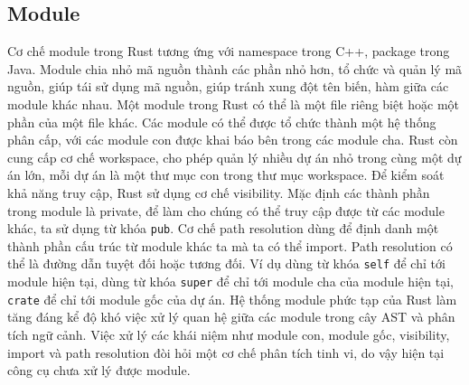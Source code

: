 \subsection{Module}

Cơ chế module trong Rust tương ứng với namespace trong C++, package trong Java.
Module chia nhỏ mã nguồn thành các phần nhỏ hơn, tổ chức và quản lý mã nguồn, giúp tái sử dụng mã nguồn, giúp tránh xung đột tên biến, hàm giữa các module khác nhau.
Một module trong Rust có thể là một file riêng biệt hoặc một phần của một file khác.
Các module có thể được tổ chức thành một hệ thống phân cấp, với các module con được khai báo bên trong các module cha.
Rust còn cung cấp cơ chế workspace, cho phép quản lý nhiều dự án nhỏ trong cùng một dự án lớn, mỗi dự án là một thư mục con trong thư mục workspace.
Để kiểm soát khả năng truy cập, Rust sử dụng cơ chế visibility.
Mặc định các thành phần trong module là private, để làm cho chúng có thể truy cập được từ các module khác, ta sử dụng từ khóa \texttt{pub}.
Cơ chế path resolution dùng để định danh một thành phần cấu trúc từ module khác ta mà ta có thể import.
Path resolution có thể là đường dẫn tuyệt đối hoặc tương đối.
Ví dụ dùng từ khóa \texttt{self} để chỉ tới module hiện tại, dùng từ khóa \texttt{super} để chỉ tới module cha của module hiện tại, \texttt{crate} để chỉ tới module gốc của dự án.
Hệ thống module phức tạp của Rust làm tăng đáng kể độ khó việc xử lý quan hệ giữa các module trong cây AST và phân tích ngữ cảnh.
Việc xử lý các khái niệm như module con, module gốc, visibility, import và path resolution đòi hỏi một cơ chế phân tích tinh vi, do vậy hiện tại công cụ chưa xử lý được module.



